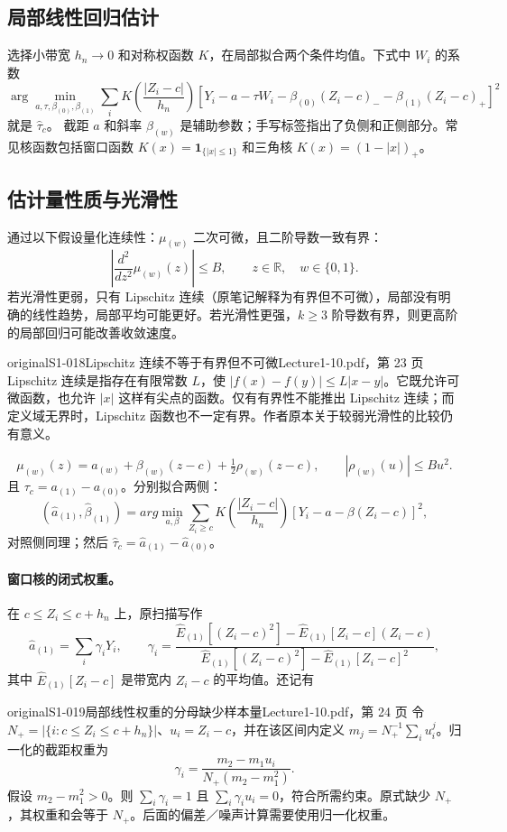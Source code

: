 \subsection{局部线性回归估计}
选择小带宽 $h_n\to0$ 和对称权函数 $K$，在局部拟合两个条件均值。下式中 $W_i$ 的系数
\[
\arg\min_{a,\tau,\beta_{(0)},\beta_{(1)}}\sum_i
K\left(\frac{|Z_i-c|}{h_n}\right)
[Y_i-a-\tau W_i-\beta_{(0)}(Z_i-c)_--\beta_{(1)}(Z_i-c)_+]^2
\]
就是 $\widehat\tau_c$。
截距 $a$ 和斜率 $\beta_{(w)}$ 是辅助参数；手写标签指出了负侧和正侧部分。常见核函数包括窗口函数 $K(x)=\mathbf1_{\{|x|\leq1\}}$ 和三角核 $K(x)=(1-|x|)_+$。
\subsection{估计量性质与光滑性}
通过以下假设量化连续性：$\mu_{(w)}$ 二次可微，且二阶导数一致有界：
\[
\left|\frac{d^2}{dz^2}\mu_{(w)}(z)\right|\leq B,
\qquad z\in\mathbb R,\quad w\in\{0,1\}.
\]
若光滑性更弱，只有 Lipschitz 连续（原笔记解释为有界但不可微），局部没有明确的线性趋势，局部平均可能更好。若光滑性更强，$k\geq3$ 阶导数有界，则更高阶的局部回归可能改善收敛速度。
\begin{reviewnote}{original}{S1-018}{Lipschitz 连续不等于有界但不可微}{Lecture1-10.pdf，第 23 页}
Lipschitz 连续是指存在有限常数 $L$，使 $|f(x)-f(y)|\le L|x-y|$。它既允许可微函数，也允许 $|x|$ 这样有尖点的函数。仅有有界性不能推出 Lipschitz 连续；而定义域无界时，Lipschitz 函数也不一定有界。作者原本关于较弱光滑性的比较仍有意义。
\end{reviewnote}

\[
\mu_{(w)}(z)=a_{(w)}+\beta_{(w)}(z-c)+\tfrac12\rho_{(w)}(z-c),
\qquad |\rho_{(w)}(u)|\leq Bu^2.
\]
且 $\tau_c=a_{(1)}-a_{(0)}$。分别拟合两侧：
\[
(\widehat a_{(1)},\widehat\beta_{(1)})=arg\min_{a,\beta}
\sum_{Z_i\geq c}K\left(\frac{|Z_i-c|}{h_n}\right)[Y_i-a-\beta(Z_i-c)]^2,
\]
对照侧同理；然后 $\widehat\tau_c=\widehat a_{(1)}-\widehat a_{(0)}$。
\paragraph{窗口核的闭式权重。}
在 $c\leq Z_i\leq c+h_n$ 上，原扫描写作
\[
\widehat a_{(1)}=\sum_i\gamma_iY_i,\qquad
\gamma_i=\frac{\widehat E_{(1)}[(Z_i-c)^2]-\widehat E_{(1)}[Z_i-c](Z_i-c)}
{\widehat E_{(1)}[(Z_i-c)^2]-\widehat E_{(1)}[Z_i-c]^2},
\]
其中 $\widehat E_{(1)}[Z_i-c]$ 是带宽内 $Z_i-c$ 的平均值。还记有
\begin{reviewnote}{original}{S1-019}{局部线性权重的分母缺少样本量}{Lecture1-10.pdf，第 24 页}
令 $N_+=|\{i:c\le Z_i\le c+h_n\}|$、$u_i=Z_i-c$，并在该区间内定义 $m_j=N_+^{-1}\sum_i u_i^j$。归一化的截距权重为
\[
\gamma_i=\frac{m_2-m_1u_i}{N_+(m_2-m_1^2)}.
\]
假设 $m_2-m_1^2>0$。则 $\sum_i\gamma_i=1$ 且 $\sum_i\gamma_i u_i=0$，符合所需约束。原式缺少 $N_+$，其权重和会等于 $N_+$。后面的偏差／噪声计算需要使用归一化权重。
\end{reviewnote}


